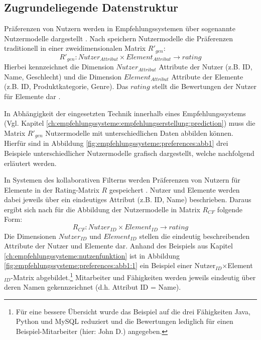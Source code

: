 \subsection{Zugrundeliegende Datenstruktur}%
Präferenzen von Nutzern werden in Empfehlungssystemen über sogenannte Nutzermodelle dargestellt \cite[S. 9]{ricci:inbook}\cite[S. 2]{jawaheer:article}\cite[S. 246]{berkovsky:article}.
Nach \textcite[S. 249f.]{berkovsky:article} speichern Nutzermodelle die Präferenzen traditionell in einer zweidimensionalen Matrix $R'_{gen}$:
\begin{equation}\label{eq4}
    R'_{gen}: Nutzer_{Attribut} \times Element_{Attribut} \rightarrow rating
\end{equation}
Hierbei kennzeichnet die Dimension $Nutzer_{Attribut}$ Attribute der Nutzer (z.B. ID, Name, Geschlecht) und die Dimension $Element_{Attribut}$ Attribute der Elemente (z.B. ID, Produktkategorie, Genre).
Das $rating$ stellt die Bewertungen der Nutzer für Elemente dar \cite[S. 250]{berkovsky:article}.

In Abhängigkeit der eingesetzten Technik innerhalb eines Empfehlungssystems (Vgl. Kapitel \ref{ch:empfehlungssysteme:empfehlungserstellung:prediction}) muss die Matrix $R'_{gen}$ Nutzermodelle mit unterschiedlichen Daten abbilden können. %
Hierfür sind in Abbildung \ref{fig:empfehlungssysteme:preferences:abb1} drei Beispiele unterschiedlicher Nutzermodelle grafisch dargestellt, welche nachfolgend erläutert werden.

In Systemen des kollaborativen Filterns werden Präferenzen von Nutzern für Elemente in der Rating-Matrix $R$ gespeichert \cite[S. 246ff.]{berkovsky:article}.
Nutzer und Elemente werden dabei jeweils über ein eindeutiges Attribut (z.B. ID, Name) beschrieben.
Daraus ergibt sich nach \textcite[S. 250]{berkovsky:article} für die Abbildung der Nutzermodelle in Matrix $R_{CF}$ folgende Form:
\begin{equation}\label{eq5}
    R_{CF}: Nutzer_{ID} \times Element_{ID} \rightarrow rating
\end{equation}
Die Dimensionen $Nutzer_{ID}$ und $Element_{ID}$ stellen die eindeutig beschreibenden Attribute der Nutzer und Elemente dar.
Anhand des Beispiels aus Kapitel \ref{ch:empfehlungssysteme:nutzenfunktion} ist in Abbildung \ref{fig:empfehlungssysteme:preferences:abb1:1} ein Beispiel einer Nutzer$_{ID}$$\times$Element$_{ID}$-Matrix abgebildet.\footnote{Für eine bessere Übersicht wurde das Beispiel auf die drei Fähigkeiten Java, Python und MySQL reduziert und die Bewertungen lediglich für einen Beispiel-Mitarbeiter (hier: John D.) angegeben.}
Mitarbeiter und Fähigkeiten werden jeweils eindeutig über deren Namen gekennzeichnet (d.h. Attribut ID = Name).

